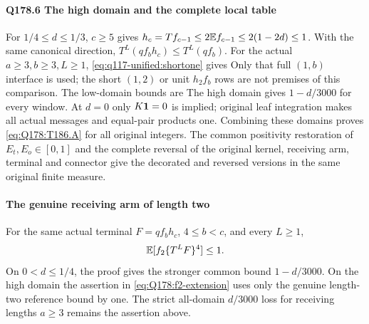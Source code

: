 \paragraph{Q178.6 The high domain and the complete local table}\label{part:Q178.6}
For $1/4\le\allowbreak  d\le\allowbreak 1/3$, $c\ge\allowbreak 5$ gives
$h_c=\allowbreak T f_{c-1}\le\allowbreak 2\mathbb E f_{c-1}\le\allowbreak 2(1-2d)\le\allowbreak 1$.
With the same canonical direction,
$T^L(qf_bh_c)\le\allowbreak  T^L(qf_b)$.
For the actual $a\ge\allowbreak3,\allowbreak b\ge\allowbreak3,\allowbreak L\ge\allowbreak1$,
\eqref{eq:q117-unified:shortone} gives
Only that full $(1,\allowbreak b)$ interface is used; the short $(1,\allowbreak 2)$ or unit
$h_2f_b$ rows are not premises of this comparison.
The low-domain bounds are
The high domain gives $1-d/3000$ for every window.
At $d=\allowbreak 0$ only $K\mathbf1=\allowbreak 0$ is implied; original leaf integration makes
all actual messages and equal-pair products one.
Combining these domains proves \eqref{eq:Q178:T186.A} for all original
integers. The common positivity restoration of $E_t,\allowbreak E_o\in[0,\allowbreak 1]$
and the complete reversal of the original kernel, receiving arm,
terminal and connector give the decorated and reversed versions in the
same original finite measure.

\paragraph{The genuine receiving arm of length two}
\label{part:Q178:f2-extension}
For the same actual terminal \(F=qf_bh_c\), \(4\le b<c\),
and every \(L\ge1\),
\begin{equation}\label{eq:Q178:f2-extension}
 \mathbb E[f_2\{T^LF\}^4]\le1.
\end{equation}
On \(0<d\le1/4\), the proof gives the stronger common bound
\(1-d/3000\). On the high domain the assertion in
\eqref{eq:Q178:f2-extension} uses only the genuine length-two
reference bound by one. The strict all-domain \(d/3000\) loss
for receiving lengths \(a\ge3\) remains the assertion above.

